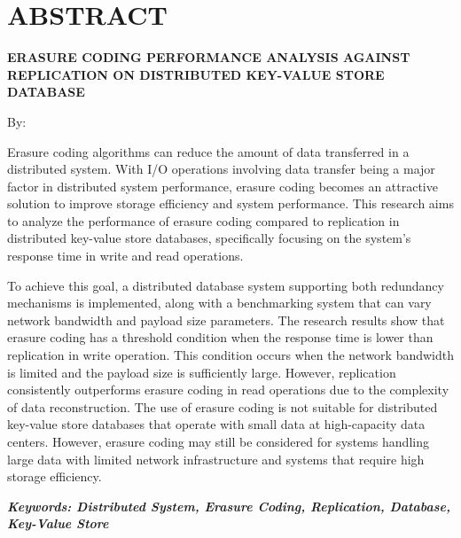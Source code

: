 \clearpage
\chapter*{ABSTRACT}

\begin{center}
  \center
  \begin{singlespace}
    \large\bfseries\MakeUppercase{Erasure Coding Performance Analysis Against Replication on Distributed Key-Value Store Database}
    
    \normalfont\normalsize
    By:
    
    \bfseries \theauthor
  \end{singlespace}
\end{center}


\begin{singlespace}
  \small
  Erasure coding algorithms can reduce the amount of data transferred in a distributed system. With I/O operations involving data transfer being a major factor in distributed system performance, erasure coding becomes an attractive solution to improve storage efficiency and system performance. This research aims to analyze the performance of erasure coding compared to replication in distributed key-value store databases, specifically focusing on the system's response time in write and read operations.

  To achieve this goal, a distributed database system supporting both redundancy mechanisms is implemented, along with a benchmarking system that can vary network bandwidth and payload size parameters. The research results show that erasure coding has a threshold condition when the response time is lower than replication in write operation. This condition occurs when the network bandwidth is limited and the payload size is sufficiently large. However, replication consistently outperforms erasure coding in read operations due to the complexity of data reconstruction. The use of erasure coding is not suitable for distributed key-value store databases that operate with small data at high-capacity data centers. However, erasure coding may still be considered for systems handling large data with limited network infrastructure and systems that require high storage efficiency.

  \textbf{\textit{Keywords: Distributed System, Erasure Coding, Replication, Database, Key-Value Store }}
\end{singlespace}
\clearpage

\clearpage